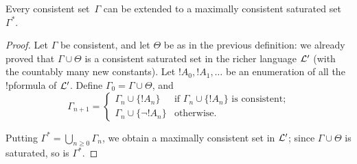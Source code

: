 \documentclass[../../include/open-logic-section]{subfiles}
\begin{document}

\begin{lem}
Every consistent set~$\Gamma$ can be extended to a maximally
consistent saturated set~$\Gamma^*$.
\end{lem}

\begin{proof}
Let $\Gamma$ be consistent, and let $\Theta$ be as in the previous
definition: we already proved that $\Gamma \cup \Theta$ is a
consistent saturated set in the richer language $\mathcal L'$ (with the
countably many new constants). Let $!A_0, !A_1, \dots$ be an
enumeration of all the !p{formula} of $\mathcal L'$. Define $\Gamma_0 =
\Gamma \cup \Theta$, and
\[
\Gamma_{n+1} =
\begin{cases}
\Gamma_n \cup \{ !A_n \} & \textrm{if $\Gamma_n \cup \{!A_n\}$ is
  consistent;} \\ 
\Gamma_n \cup \{ \lnot !A_n \} & \textrm{otherwise.}
\end{cases}
\]

Putting $\Gamma^* = \bigcup_{n \geq 0} \Gamma_n$, we obtain a maximally consistent 
set in $\mathcal L'$; since $\Gamma \cup \Theta$ is saturated, so is $\Gamma^*$. 

\end{proof}
\end{document}
